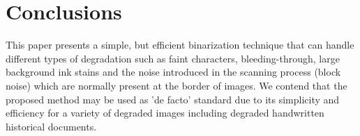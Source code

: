 \documentclass[conference]{IEEEtran}
\begin{document}
\section{Conclusions}
\label{conclude}
This paper presents a simple, but efficient binarization technique that can handle
 different types of degradation such as  faint characters, bleeding-through, large background
ink stains and the noise introduced in the scanning process (block noise) which are normally present at the border of images. 
We contend that the proposed method may be used as 'de facto' standard due to its simplicity and 
efficiency  for a variety of degraded images including
degraded handwritten historical documents.
%
%
\end{document}
